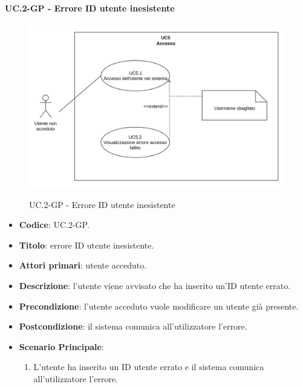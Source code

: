 	\paragraph{UC\theuccount.2-GP - Errore ID utente inesistente}
		\begin{figure}[H]
			\centering
			\includegraphics[width=\columnwidth]{img/UC5.png}\\
			\caption{UC\theuccount.2-GP - Errore ID utente inesistente}
		\end{figure}
		\begin{itemize}
			\item \textbf{Codice}: UC\theuccount.2-GP.
			\item \textbf{Titolo}: errore ID utente inesistente.
			\item \textbf{Attori primari}: utente acceduto.
			\item \textbf{Descrizione}:  l’utente viene avvisato che ha inserito un'ID utente errato.
			\item \textbf{Precondizione}: l'utente acceduto vuole modificare un utente già presente.
			\item \textbf{Postcondizione}: il sistema comunica all’utilizzatore l’errore.
			\item \textbf{Scenario Principale}:
			\begin{enumerate}
				\item L'utente ha inserito un ID utente errato e il sistema comunica all’utilizzatore l’errore.
			\end{enumerate}
		\end{itemize}
